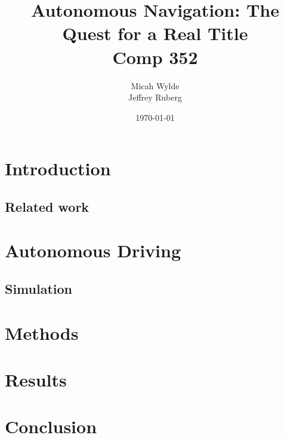 \documentclass{article}
\author{Micah Wylde\\Jeffrey Ruberg}
\date{\today}
\title{Autonomous Navigation: The Quest for a Real Title\\Comp 352}
\begin{document}
\maketitle

\section{Introduction}

\subsection{Related work}

\section{Autonomous Driving}
\subsection{Simulation}


\section{Methods}

\section{Results}

\section{Conclusion}
\end{document}
